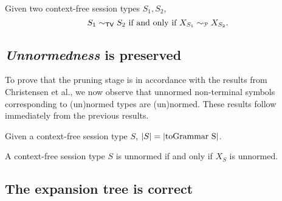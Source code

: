 \begin{theorem}
\label{cfst_vs_grammar}
	Given two context-free session types $S_1, S_2$,
	\[ S_1 \sim_{\mathsf{TV}} S_2 \text{ if and only if } X_{S_1} \sim_{\mathcal{P}} X_{S_2}. \]
\end{theorem}

\subsection{\textit{Unnormedness} is preserved}

To prove that the pruning stage is in accordance with the results 
from Christensen et al., we now observe that unnormed non-terminal symbols 
corresponding to (un)normed types are (un)normed. These results follow 
immediately from the previous results. 

\begin{corollary}
	Given a context-free session type $S$, $|S| = |\text{\lstinline{toGrammar S}}|$.
\end{corollary}

\begin{corollary}
	A context-free session type $S$ is unnormed if and only if 
	$X_S$ is unnormed.
\end{corollary}

\subsection{The expansion tree is correct}
%
%
%

